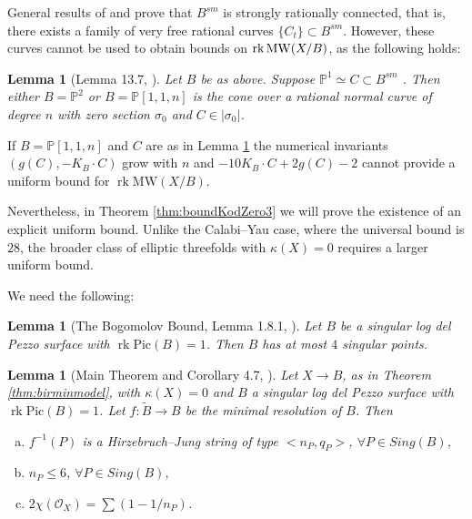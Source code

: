 \documentclass[11pt]{amsart}
\newtheorem{lemma}[theorem]{Lemma}
\theoremstyle{definition}
\theoremstyle{definition}
\theoremstyle{remark}
\theoremstyle{remark}
\theoremstyle{definition}
\theoremstyle{conjecture}
\newcommand{\MW}{\mathrm{MW}}
\newcommand{\Pic}{\mathrm{Pic}}
\begin{document}
 
General results of \cite[Thm. 6.5]{XuSRC2012}  and \cite[Lemma 13.7]{KeelMcKernan1999} prove that $B^{sm}$ is strongly rationally connected, that is,  there  exists a family of very free rational curves $\{C_t\}  \subset  B^{sm}$.
However, these curves  cannot be used to obtain bounds on ${\rm rk}\, \MW(X/B)$, as  the following holds:
\begin{lemma}[Lemma 13.7, \cite{KeelMcKernan1999}]\label{lemma:KeelMcK} Let $B$ be as above.
    Suppose $\mathbb{P}^1 \simeq C \subset B^{sm}$%
    . Then either $B=\mathbb{P}^2$ or $B=\mathbb{P}[1,1, n]$ is the cone over a rational normal curve of degree $n$ with zero section $\sigma_0$
    and $C  \in | 
    \sigma_0|$.
\end{lemma}
If  $B=\mathbb{P}[1,1, n]$ and $C$ are  as in Lemma \ref{lemma:KeelMcK} the numerical invariants 
${(g(C), -K_B \cdot C)}$ grow with $n$ and  $-10K_B \cdot C + 2g(C)-2$  cannot provide a uniform bound for $\operatorname{rk}\MW(X/B)$.

\smallskip

Nevertheless, in    Theorem \ref{thm:boundKodZero3} we will   prove the existence of an explicit uniform bound.
 Unlike the Calabi{--}Yau case, where the universal bound is $28$, the broader class of elliptic threefolds with $\kappa (X)=0$ requires a larger uniform bound. 




We need the following:

\begin{lemma}[The Bogomolov Bound, Lemma 1.8.1, \cite{KeelMcKernan1999}]\label{lemma:bog} Let $B$ be a  singular log del Pezzo surface  with $\operatorname{rk}{\Pic}(B)=1$. Then $B$ has at most $4$ singular points.
\end{lemma}
\begin{lemma}[Main Theorem and Corollary 4.7, \cite{GrassiSingBase1993}]\label{lemma:SingsBaseK0} Let $X \to B$, as in Theorem \ref{thm:birminmodel}, with $\kappa(X)=0$ and  
 $B$  a  singular log del Pezzo surface with $\operatorname{rk}{\Pic}(B)=1$. 
Let 
$f:\widetilde B\rightarrow B$ be 
the minimal resolution of $B$. Then
\begin{enumerate}[(a)]
    \item  $f^{-1}(P)$ is a Hirzebruch--Jung string of type
$<n_P,q_P>$,  $\forall P \in Sing(B)$,
\item 
$n_P\le 6$, $\forall P \in Sing(B)$,
\item
$2 \chi(\mathcal O_X)=
\sum (1-1/n_P)$.
\end{enumerate}   
\end{lemma}
\end{document}
